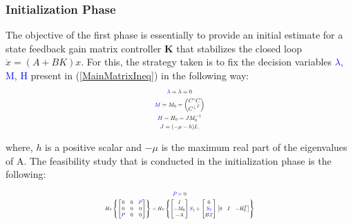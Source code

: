 \vspace{-0.5cm}

\subsubsection{Initialization Phase} 

The objective of the first phase is essentially to provide an initial estimate for a state feedback gain matrix controller \textbf{K} that stabilizes the closed loop $\Dot{x}=(A+BK)x$. For this, the strategy taken is to fix the decision variables \textcolor{blue}{$\lambda$, M, H} present in (\ref{MainMatrixIneq}) in the following way:
\begin{equation}
\resizebox{0.15\textwidth}{!}{$
    \begin{gathered}
        \textcolor{blue}{\lambda} = \lambda = 0 \\
        \textcolor{blue}{M} = M_0 = \begin{pmatrix}
            C^{\circ}C\\
            {C^{\perp}}^T
        \end{pmatrix}\\
        \textcolor{blue}{H} = H_0 = J M_0^{-1} \\
        J = (-\mu-h)I,
    \end{gathered}$}
    \label{InitVariableFixing}
\end{equation} 

where, $h$ is a positive scalar and $-\mu$ is the maximum real part of the eigenvalues of A. The feasibility study that is conducted in the initialization phase is the following:

\vspace{-0.5cm}

\begin{equation}
\resizebox{0.45\textwidth}{!}{$
    \begin{gathered}
        \textcolor{blue}{P} \succ 0 \\
        He\left\{ \begin{bmatrix}
            0 & 0 & \textcolor{blue}{P}\\
            0 & 0 & 0\\
            \textcolor{blue}{P} & 0 & 0
        \end{bmatrix}\right\}
    \prec
    He\left\{\begin{bmatrix}
            I\\
            -M_0 \\
            -A
    \end{bmatrix}
    \textcolor{blue}{S_1} +
    \begin{bmatrix}
        0\\
        \textcolor{blue}{S_2}\\
        B\textcolor{blue}{Z}
    \end{bmatrix}
    \begin{bmatrix}
        0 & I & -H_0^T
    \end{bmatrix}\right\}
    \end{gathered}$}
    \label{InitMatrixIneq}
\end{equation} 

